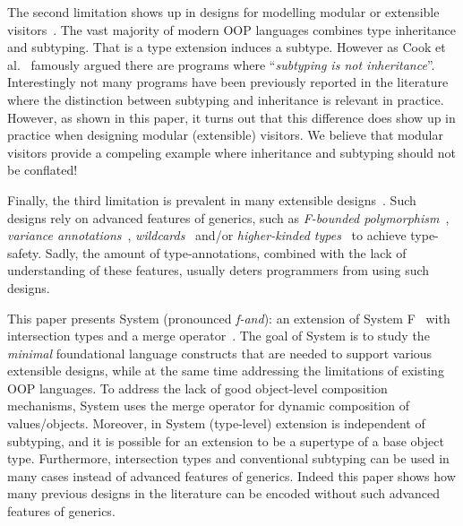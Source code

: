   The second limitation shows up in designs for modelling
  modular or extensible visitors~\cite{togersen:2004,oliveira09modular}.  The vast majority of modern
  OOP languages combines type inheritance and subtyping. 
  That is a type extension induces a subtype. However
  as Cook et al.~\cite{cook1989inheritance} famously argued there are programs where
  ``\emph{subtyping is not inheritance}''. Interestingly 
  not many programs have been previously reported in the literature
  where the distinction between subtyping and inheritance is
  relevant in practice. However, as shown in this paper, it turns out that this
  difference does show up in practice when designing modular
  (extensible) visitors.  We believe that modular visitors provide a
  compeling example where inheritance and subtyping should
  not be conflated!

  Finally, the third limitation is prevalent in many extensible
  designs~\cite{togersen:2004,Zenger-Odersky2005,oliveira09modular,oliveira2013feature,rendel14attributes}.
  Such designs rely on advanced features of generics,
  such as \emph{F-bounded polymorphism}~\cite{Canning89f-bounded}, \emph{variance
    annotations}~\cite{Igarashi06variant}, \emph{wildcards}~\cite{Torgersen04wildcards} and/or \emph{higher-kinded
    types}~\cite{Moors08generics} to achieve type-safety. Sadly, the amount of
  type-annotations, combined with the lack of understanding of these
  features, usually deters programmers from using such designs.

\begin{comment}
Motivated by the insights gained in previous work, this paper presents 
a minimal core calculus that addresses current limitations and
provides a better foundational model for statically typed
delegation-based OOP? We show that Object Algebras fit nicely in this
model. 
\end{comment}

This paper presents System \name (pronounced \emph{f-and}): an extension of System F~\cite{Reynolds74f}
with intersection types and a merge operator~\cite{dunfield2014elaborating}.  The goal of
System \name is to study the \emph{minimal} foundational language
constructs that are needed to support various extensible designs,
while at the same time addressing the limitations of existing OOP
languages. To address the lack of good object-level composition
mechanisms, System \name uses the merge operator for dynamic
composition of values/objects. Moreover, in System \name (type-level)
extension is independent of subtyping, and it is possible for an
extension to be a supertype of a base object type. Furthermore,
intersection types and conventional subtyping can be used in many
cases instead of advanced features of generics. Indeed this paper 
shows how many previous designs in the literature can be encoded 
without such advanced features of generics.


